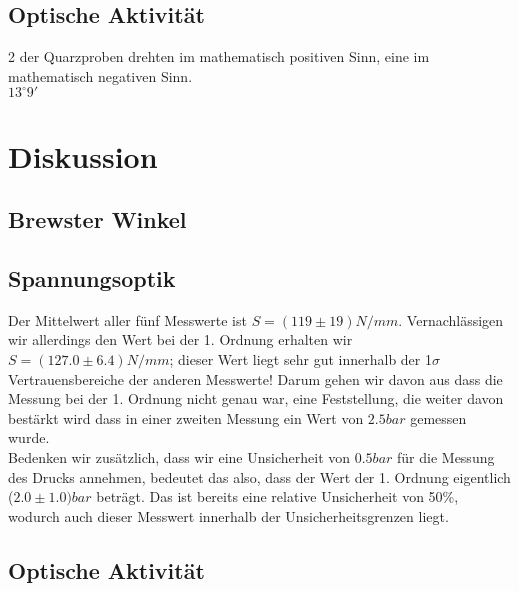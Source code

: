 \documentclass{article}
\begin{document}
\subsection{Optische Aktivität}
2 der Quarzproben drehten im mathematisch positiven Sinn, eine im mathematisch negativen Sinn.\\

$13^\circ 9'$
\section{Diskussion}
\subsection{Brewster Winkel}
\subsection{Spannungsoptik}

Der Mittelwert aller fünf Messwerte ist $S=(119 \pm 19)\si{N/mm}$. Vernachlässigen wir allerdings den Wert bei der 1. Ordnung erhalten wir $S=(127.0 \pm 6.4)\si{N/mm}$; dieser Wert liegt sehr gut innerhalb der 1$\sigma$ Vertrauensbereiche der anderen Messwerte! Darum gehen wir davon aus dass die Messung bei der 1. Ordnung nicht genau war, eine Feststellung, die weiter davon bestärkt wird dass in einer zweiten Messung ein Wert von $2.5 \si{bar}$ gemessen wurde.\\
Bedenken wir zusätzlich, dass wir eine Unsicherheit von $0.5 \si{bar}$ für die Messung des Drucks annehmen, bedeutet das also, dass der Wert der 1. Ordnung eigentlich ($2.0 \pm 1.0)\si{bar}$ beträgt. Das ist bereits eine relative Unsicherheit von 50\%, wodurch auch dieser Messwert innerhalb der Unsicherheitsgrenzen liegt. 

\subsection{Optische Aktivität}
																					
\end{document}
